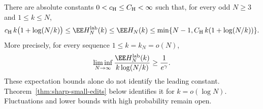\documentclass[11pt,letterpaper]{article}
\begin{document}
\begin{theorem}
\label{thm:uniform-history}
There are absolute constants $0<c_{\rm H}\le C_{\rm H}<\infty$
such that, for every odd $N\ge3$ and $1\le k\le N$,
\begin{equation}\label{eq:uniform-history}
 c_{\rm H}\,k\bigl(1+\log(N/k)\bigr)
 \le\EE H_N^{\rm lab}(k)\le\EE H_N(k)
 \le\min\{N-1,C_{\rm H}\,k(1+\log(N/k))\}.
\end{equation}
More precisely, for every sequence $1\le k=k_N=o(N)$,
\begin{equation}\label{eq:uniform-history-coefficient}
 \liminf_{N\to\infty}
 \frac{\EE H_N^{\rm lab}(k)}
      {k\log(N/k)}\ge\frac1{e^\gamma}.
\end{equation}
These expectation bounds alone do not identify the leading constant.
Theorem~\ref{thm:sharp-small-edits} below identifies it for
$k=o(\log N)$. Fluctuations and lower bounds with high probability
remain open.
\end{theorem}
\end{document}
